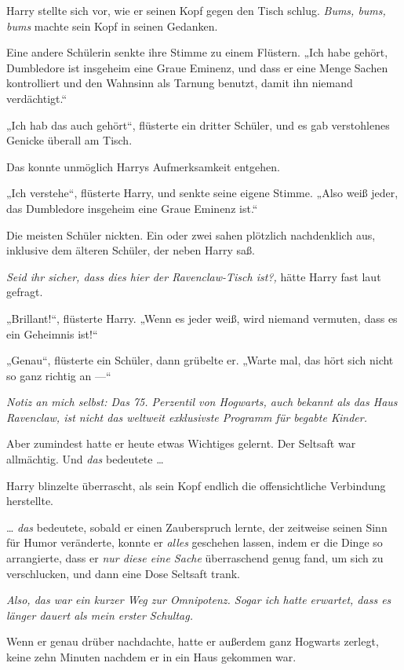 {Harry stellte sich vor, wie er seinen Kopf gegen den Tisch schlug. \emph{Bums, bums, bums} machte sein Kopf in seinen Gedanken.

Eine andere Schülerin senkte ihre Stimme zu einem Flüstern. „Ich habe gehört, Dumbledore ist insgeheim eine Graue Eminenz, und dass er eine Menge Sachen kontrolliert und den Wahnsinn als Tarnung benutzt, damit ihn niemand verdächtigt.“

„Ich hab das auch gehört“, flüsterte ein dritter Schüler, und es gab verstohlenes Genicke überall am Tisch.

Das konnte unmöglich Harrys Aufmerksamkeit entgehen.

„Ich verstehe“, flüsterte Harry, und senkte seine eigene Stimme. „Also weiß jeder, das Dumbledore insgeheim eine Graue Eminenz ist.“

Die meisten Schüler nickten. Ein oder zwei sahen plötzlich nachdenklich aus, inklusive dem älteren Schüler, der neben Harry saß.

\emph{Seid ihr sicher, dass dies hier der Ravenclaw-Tisch ist?,} hätte Harry fast laut gefragt.

„Brillant!“, flüsterte Harry. „Wenn es jeder weiß, wird niemand vermuten, dass es ein Geheimnis ist!“

„Genau“, flüsterte ein Schüler, dann grübelte er. „Warte mal, das hört sich nicht so ganz richtig an —“

\emph{Notiz an mich selbst: Das 75. Perzentil von Hogwarts, auch bekannt als das Haus Ravenclaw, ist nicht das weltweit exklusivste Programm für begabte Kinder.}

Aber zumindest hatte er heute etwas Wichtiges gelernt. Der Seltsaft war allmächtig. Und \emph{das} bedeutete …

Harry blinzelte überrascht, als sein Kopf endlich die offensichtliche Verbindung herstellte.

… \emph{das} bedeutete, sobald er einen Zauberspruch lernte, der zeitweise seinen Sinn für Humor veränderte, konnte er \emph{alles} geschehen lassen, indem er die Dinge so arrangierte, dass er \emph{nur diese eine Sache} überraschend genug fand, um sich zu verschlucken, und dann eine Dose Seltsaft trank.

\emph{Also, das war ein kurzer Weg zur Omnipotenz. Sogar ich hatte erwartet, dass es länger dauert als mein erster Schultag.}

Wenn er genau drüber nachdachte, hatte er außerdem ganz Hogwarts zerlegt, keine zehn Minuten nachdem er in ein Haus gekommen war.

}
